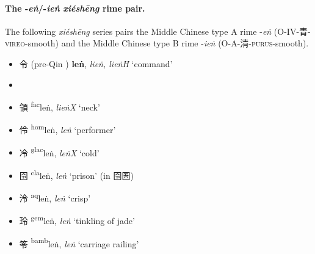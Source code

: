 \paragraph{The -\textit{eṅ}/-\textit{ieṅ} \textit{xiéshēng} rime pair.}
\label{par:eng-ieng-XS-pair}
The following \textit{xiéshēng} series pairs the Middle Chinese type A rime -\textit{eṅ} (O-IV-青-\textsc{vireo}-smooth) and the Middle Chinese type B rime -\textit{ieṅ} (O-A-清-\textsc{purus}-smooth). 



\begin{itemize}
    \item {\Large{令}} 
  (pre-Qin
    \makebox[0.8em][l]{\raisebox{-0.6em}{}})
    {\large{\textbf{leṅ}}},
    \textit{lieṅ, lieṅH} `command' %

\vspace{-\medskipamount}


   \item {} %

    \item {\Large{領}} %
    {\large{{\textsuperscript{fac}}leṅ}},
    \textit{lieṅX} `neck' %

    \item {\Large{伶}} %
    {\large{{\textsuperscript{hom}}leṅ}},
    \textit{leṅ} `performer' %

    \item {\Large{冷}} %
    {\large{{\textsuperscript{glac}}leṅ}},
    \textit{leṅX} `cold' %

    \item {\Large{囹}} %
    {\large{{\textsuperscript{cla}}leṅ}},
    \textit{leṅ} `prison' (in 囹圄) %

    \item {\Large{泠}} %
    {\large{{\textsuperscript{aq}}leṅ}},
    \textit{leṅ} `crisp' %

    \item {\Large{玲}} %
    {\large{{\textsuperscript{gem}}leṅ}},
    \textit{leṅ} `tinkling of jade' %

    \item {\Large{笭}} %
    {\large{{\textsuperscript{bamb}}leṅ}},
    \textit{leṅ} `carriage railing' %


\end{itemize}
